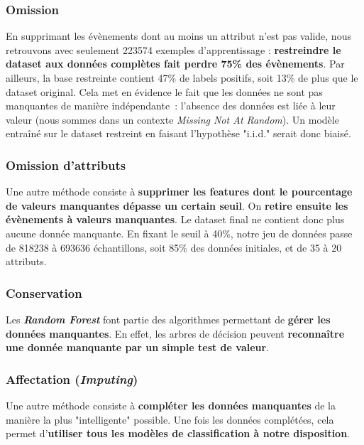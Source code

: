 \documentclass[12pt]{article}
\begin{document}
\subsubsection{Omission}

En supprimant les évènements dont au moins un attribut n'est pas valide, nous
retrouvons avec seulement 223574 exemples d’apprentissage : \textbf{restreindre
le dataset aux données complètes fait perdre 75\% des évènements}. Par ailleurs,
la base restreinte contient 47\% de labels positifs, soit 13\% de plus que le
dataset original. Cela met en évidence le fait que les données ne sont pas
manquantes de manière indépendante : l’absence des données est liée à leur
valeur (nous sommes dans un contexte \emph{Missing Not At Random}). Un modèle
entraîné sur le dataset restreint en faisant l’hypothèse "i.i.d." serait donc
biaisé.

\subsubsection{Omission d'attributs}

Une autre méthode consiste à \textbf{supprimer les features dont le pourcentage
de valeurs manquantes dépasse un certain seuil}. On \textbf{retire ensuite les
évènements à valeurs manquantes}. Le dataset final ne contient donc plus aucune
donnée manquante. En fixant le seuil à 40\%, notre jeu de données passe de
818238 à 693636 échantillons, soit 85\% des données initiales, et de 35 à 20
attributs.


\subsubsection{Conservation}

Les \textbf{\emph{Random Forest}} font partie des algorithmes permettant de
\textbf{gérer les données manquantes}. En effet, les arbres de décision peuvent
\textbf{reconnaître une donnée manquante par un simple test de valeur}.

\subsubsection{Affectation (\emph{Imputing})}

Une autre méthode consiste à \textbf{compléter les données manquantes} de la
manière la plus "intelligente" possible. Une fois les données complétées, cela
permet d’\textbf{utiliser tous les modèles de classification à notre
disposition}. 
\end{document}
